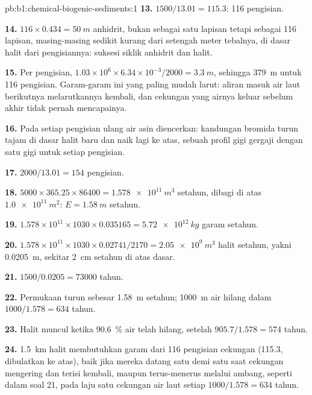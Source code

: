 \begin{solution}{pb:b1:chemical-biogenic-sediments:1}
\textbf{13.} $1500/13.01 = 115.3$: 116 pengisian.

\textbf{14.} $116\times0.434 = \qty{50}{m}$ anhidrit, bukan sebagai satu lapisan tetapi
sebagai 116 lapisan, masing-masing sedikit kurang dari setengah meter tebalnya, di dasar
halit dari pengisiannya: suksesi siklik anhidrit dan halit.

\textbf{15.} Per pengisian, $1.03\times10^6\times6.34\times10^{-3}/2000 =
\qty{3.3}{m}$, sehingga \qty{379}{m} untuk 116 pengisian. Garam-garam ini yang paling
mudah larut: aliran masuk air laut berikutnya melarutkannya kembali, dan cekungan yang
airnya keluar sebelum akhir tidak pernah mencapainya.

\textbf{16.} Pada setiap pengisian ulang air asin diencerkan: kandungan bromida turun
tajam di dasar halit baru dan naik lagi ke atas, sebuah profil gigi gergaji dengan satu
gigi untuk setiap pengisian.

\textbf{17.} $2000/13.01 = 154$ pengisian.

\textbf{18.} $5000\times365.25\times86400 = \qty{1.578e11}{m^3}$ setahun, dibagi di atas
$\qty{1.0e11}{m^2}$: $E = \qty{1.58}{m}$ setahun.

\textbf{19.} $1.578\times10^{11}\times1030\times0.035165 = \qty{5.72e12}{kg}$ garam setahun.

\textbf{20.} $1.578\times10^{11}\times1030\times0.02741/2170 =
\qty{2.05e9}{m^3}$ halit setahun, yakni \qty{0.0205}{m}, sekitar \qty{2}{cm} setahun di
atas dasar.

\textbf{21.} $1500/0.0205 = \num{73000}$ tahun.

\textbf{22.} Permukaan turun sebesar \qty{1.58}{m} setahun; \qty{1000}{m} air hilang
dalam $1000/1.578 = 634$ tahun.

\textbf{23.} Halit muncul ketika \qty{90.6}{\%} air telah hilang, setelah
$905.7/1.578 = 574$ tahun.

\textbf{24.} \qty{1.5}{km} halit membutuhkan garam dari 116 pengisian cekungan (115.3,
dibulatkan ke atas), baik jika mereka datang satu demi satu saat cekungan mengering dan
terisi kembali, maupun terus-menerus melalui ambang, seperti dalam soal 21, pada
laju satu cekungan air laut setiap $1000/1.578 = 634$ tahun.
\end{solution}

